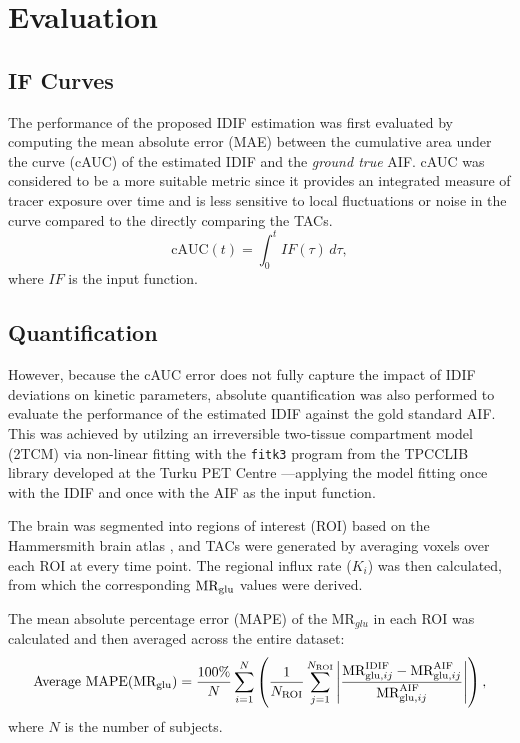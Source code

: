 \section{Evaluation}
\subsection{IF Curves}
The performance of the proposed IDIF estimation was first evaluated by computing the mean absolute error (MAE) between the cumulative area under the curve (cAUC) of the estimated IDIF and the \textit{ground true} AIF. cAUC was considered to be a more suitable metric since it provides an integrated measure of tracer exposure over time and is less sensitive to local fluctuations or noise in the curve compared to the directly comparing the TACs.
\begin{equation}
	\textrm{cAUC}(t) =  \int_{0}^{t} IF(\tau) \, d\tau,
\end{equation}
where \(IF\) is the input function.

\subsection{Quantification}
However, because the cAUC error does not fully capture the impact of IDIF deviations on kinetic parameters, absolute quantification was also performed to evaluate the performance of the estimated IDIF against the gold standard AIF.
This was achieved by utilzing an irreversible two-tissue compartment model (2TCM) via non-linear fitting with the \texttt{fitk3} program from the TPCCLIB library developed at the Turku PET Centre \cite{oikonen2018tpcclib}—applying the model fitting once with the IDIF and once with the AIF as the input function.

The brain was segmented into regions of interest (ROI) based on the Hammersmith brain atlas \cite{hammers2003three}, and TACs were generated by averaging voxels over each ROI at every time point.
The regional influx rate (\(K_i\)) was then calculated, from which the corresponding \(\text{MR}_{\text{glu}}\) values were derived.

The mean absolute percentage error (MAPE) of the \(\textrm{MR}_{glu}\) in each ROI was calculated and then averaged across the entire dataset:
\begin{equation}
	\text{Average MAPE}(\text{MR}_{\text{glu}})= \frac{100\%}{N} \sum_{i=1}^{N} \left( \frac{1}{N_{\text{ROI}}} \sum_{j=1}^{N_{\text{ROI}}} \left| \frac{\textrm{MR}_{\textrm{glu},ij}^{\textrm{IDIF}} - \textrm{MR}_{\textrm{glu},ij}^{\textrm{AIF}}}{\textrm{MR}_{\textrm{glu},ij}^{\textrm{AIF}}} \right| \right),
\end{equation}
where $N$ is the number of subjects.

